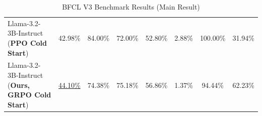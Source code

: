 \begin{table}[!t]
{\begin{tabular}{lccccccc}
Llama-3.2-3B-Instruct (\textbf{PPO Cold Start}) & 42.98\% & 84.00\% & 72.00\% & 52.80\% & 2.88\% & 100.00\% & 31.94\% \\
Llama-3.2-3B-Instruct (\textbf{Ours, GRPO Cold Start}) & \uline{44.10\%} & 74.38\% & 75.18\% & 56.86\% & 1.37\% & 94.44\% & 62.23\% \\
\bottomrule
\end{tabular}
}
\caption{BFCL V3 Benchmark Results (Main Result)}
\label{tab:bfcl-result-main}
\end{table}


